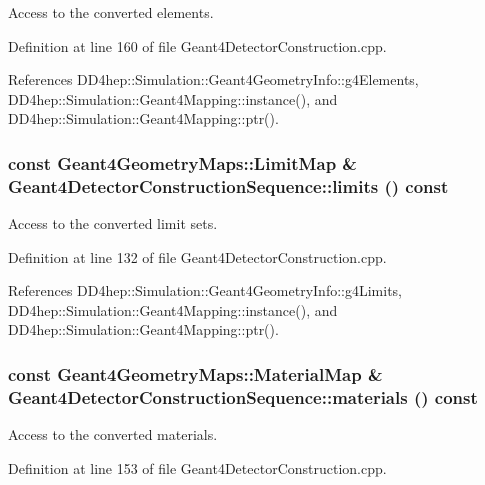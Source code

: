 Access to the converted elements. 

Definition at line 160 of file Geant4DetectorConstruction.cpp.

References DD4hep::Simulation::Geant4GeometryInfo::g4Elements, DD4hep::Simulation::Geant4Mapping::instance(), and DD4hep::Simulation::Geant4Mapping::ptr().\hypertarget{class_d_d4hep_1_1_simulation_1_1_geant4_detector_construction_sequence_a99b5ddba09b53b9fad6193b59c903e79}{
\subsubsection[{limits}]{\setlength{\rightskip}{0pt plus 5cm}const {\bf Geant4GeometryMaps::LimitMap} \& Geant4DetectorConstructionSequence::limits () const}}
\label{class_d_d4hep_1_1_simulation_1_1_geant4_detector_construction_sequence_a99b5ddba09b53b9fad6193b59c903e79}


Access to the converted limit sets. 

Definition at line 132 of file Geant4DetectorConstruction.cpp.

References DD4hep::Simulation::Geant4GeometryInfo::g4Limits, DD4hep::Simulation::Geant4Mapping::instance(), and DD4hep::Simulation::Geant4Mapping::ptr().\hypertarget{class_d_d4hep_1_1_simulation_1_1_geant4_detector_construction_sequence_abd810f881c6a11acd9ad048b8f908ce6}{
\subsubsection[{materials}]{\setlength{\rightskip}{0pt plus 5cm}const {\bf Geant4GeometryMaps::MaterialMap} \& Geant4DetectorConstructionSequence::materials () const}}
\label{class_d_d4hep_1_1_simulation_1_1_geant4_detector_construction_sequence_abd810f881c6a11acd9ad048b8f908ce6}


Access to the converted materials. 

Definition at line 153 of file Geant4DetectorConstruction.cpp.

